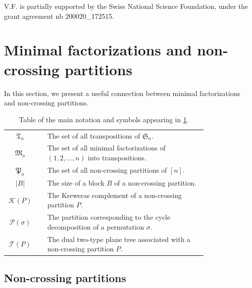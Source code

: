 \documentclass[AHL,XML,longabstracts,Unicode]{cedram}
\def\PPP{\mathcal P}
\begin{document}
V.F. is partially supported by the Swiss National Science Foundation, under
the grant agreement nb 200020\_172515.

\setcounter{tocdepth}{2}
\tableofcontents



\section{Minimal factorizations and non-crossing partitions}
\label{sec:ncp}

In this section, we present a useful connection between minimal factorizations and non-crossing partitions.


\begin{table}[htbp]\caption{Table of the main notation and symbols appearing in \cref{sec:ncp}.}
\centering
\begin{tabular}{c c p{0.8\linewidth} }
\toprule
$\mathfrak{T}_{n}$ & & The set of all transpositions of $\mathfrak{S}_{n}$. \\
$\mathfrak{M}_{n}$ & & The set of all minimal factorizations of  $(1,2, \ldots,n)$ into transpositions. \\
$\mathfrak{P}_{n}$ & & The set of all non-crossing partitions of $[n]$. \\
$|B|$ & & The size of a block $B$ of a non-crossing partition. \\
$ \mathcal{K}(P)$ &  & The Kreweras complement of a non-crossing partition $P$.\\
$\PPP(\sigma)$ & & The partition corresponding to the cycle decomposition of a permutation $\sigma$.\\
$ \mathcal{T}(P)$ & & The dual two-type plane tree  associated with a non-crossing partition $P$. \\
\bottomrule
\end{tabular}
\label{tab:secncp}
\end{table}




\subsection{Non-crossing partitions}
\label{ssec:ncp}
\end{document}
